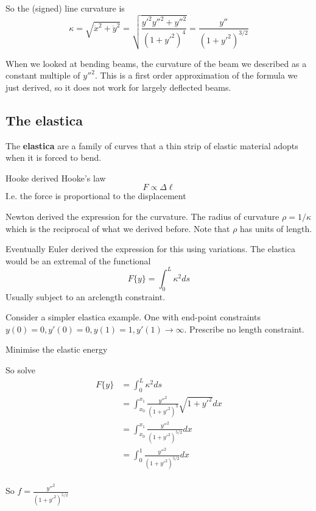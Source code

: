 \documentclass{E:/Documents/Latex/myassignment}
\begin{document}
So the (signed) line curvature is
\[\kappa = \sqrt{\ddot x^2 + \ddot y^2} = \sqrt{\frac{y'^2y''^2 + y''^2}{(1+y'^2)^4}} = \frac{y''}{(1+y'^2)^{3/2}}\]



When we looked at bending beams, the curvature of the beam we described as a constant multiple of $y''^2$. This is a first order approximation of the formula we just derived, so it does not work for largely deflected beams.


\subsection{The elastica}
The \textbf{elastica} are a family of curves that a thin strip of elastic material adopts when it is forced to bend. 

Hooke derived Hooke's law
\[F \propto \Delta \ell\]
I.e. the force is proportional to the displacement

Newton derived the expression for the curvature. The radius of curvature $\rho = 1/\kappa$ which is the reciprocal of what we derived before.
Note that $\rho$ has units of length.

Eventually Euler derived the expression for this using variations. The elastica would be an extremal of the functional
\[F\{y\} = \int_0^L \kappa^2 ds\]
Usually subject to an arclength constraint.

Consider a simpler elastica example. One with end-point constraints $y(0) = 0, y'(0) = 0, y(1)=1, y'(1) \to \infty$.
Prescribe no length constraint.

Minimise the elastic energy

So solve 
\begin{align*}
	F\{y\} &= \int_0^L \kappa^2 ds\\	
	&= \int_{x_0}^{x_1} \frac{y''^2}{(1+y'^2)^3} \sqrt{1+y'^2} dx\\
	&= \int_{x_0}^{x_1} \frac{y''^2}{(1+y'^2)^{5/2}} dx\\
	&= \int_{0}^{1} \frac{y''^2}{(1+y'^2)^{5/2}} dx\\
\end{align*}

So $f = \frac{y''^2}{(1+y'^2)^{5/2}}$
\end{document}
